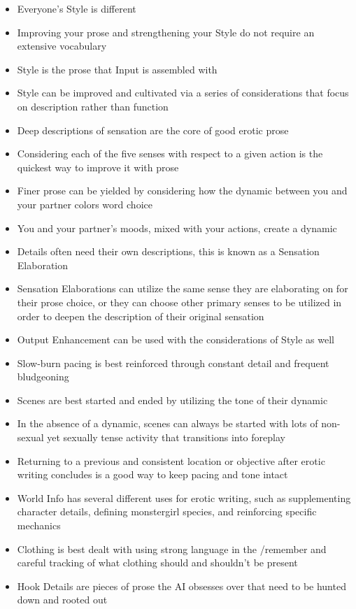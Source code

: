 \documentclass[Source-main.tex]{subfiles}
\begin{document}
\begin{itemize}
\item{Everyone's Style is different}
\item{Improving your prose and strengthening your Style do not require an extensive vocabulary}
\item{Style is the prose that Input is assembled with}
\item{Style can be improved and cultivated via a series of considerations that focus on description rather than function}
\item{Deep descriptions of sensation are the core of good erotic prose}
\item{Considering each of the five senses with respect to a given action is the quickest way to improve it with prose}
\item{Finer prose can be yielded by considering how the dynamic between you and your partner colors word choice}
\item{You and your partner's moods, mixed with your actions, create a dynamic}
\item{Details often need their own descriptions, this is known as a Sensation Elaboration}
\item{Sensation Elaborations can utilize the same sense they are elaborating on for their prose choice, or they can choose other primary senses to be utilized in order to deepen the description of their original sensation}
\item{Output Enhancement can be used with the considerations of Style as well}

\item{Slow-burn pacing is best reinforced through constant detail and frequent bludgeoning}
\item{Scenes are best started and ended by utilizing the tone of their dynamic}
\item{In the absence of a dynamic, scenes can always be started with lots of non-sexual yet sexually tense activity that transitions into foreplay}
\item{Returning to a previous and consistent location or objective after erotic writing concludes is a good way to keep pacing and tone intact}
\item{World Info has several different uses for erotic writing, such as supplementing character details, defining monstergirl species, and reinforcing specific mechanics}
\item{Clothing is best dealt with using strong language in the /remember and careful tracking of what clothing should and shouldn't be present}
\item{Hook Details are pieces of prose the AI obsesses over that need to be hunted down and rooted out}

\end{itemize}
\end{document}
